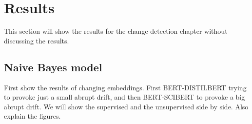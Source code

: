 \documentclass[12pt]{report}
\begin{document}
\section{Results}

This section will show the results for the change detection chapter without discussing the results.

\subsection{Naive Bayes model}

First show the results of changing embeddings. First BERT-DISTILBERT trying to provoke just a small abrupt drift, and then BERT-SCIBERT to provoke a big abrupt drift. We will show the supervised and the unsupervised side by side. Also explain the figures.
\end{document}
